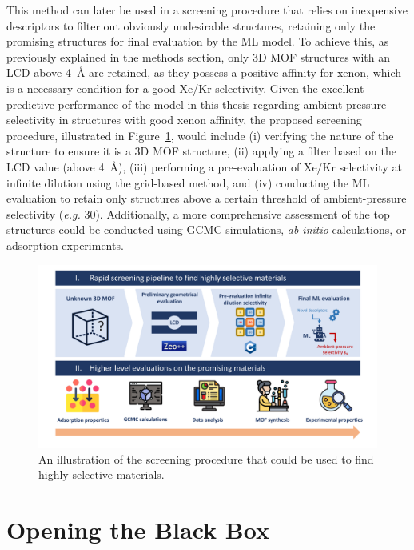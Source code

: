 \documentclass[main]{subfiles}
\begin{document}
This method can later be used in a screening procedure that relies on inexpensive descriptors to filter out obviously undesirable structures, retaining only the promising structures for final evaluation by the ML model. To achieve this, as previously explained in the methods section, only 3D MOF structures with an LCD above \SI{4}{\angstrom} are retained, as they possess a positive affinity for xenon, which is a necessary condition for a good Xe/Kr selectivity. Given the excellent predictive performance of the model in this thesis regarding ambient pressure selectivity in structures with good xenon affinity, the proposed screening procedure, illustrated in Figure~\ref{fgr:pipeline}, would include (i) verifying the nature of the structure to ensure it is a 3D MOF structure, (ii) applying a filter based on the LCD value (above \SI{4}{\angstrom}), (iii) performing a pre-evaluation of Xe/Kr selectivity at infinite dilution using the grid-based method, and (iv) conducting the ML evaluation to retain only structures above a certain threshold of ambient-pressure selectivity (\emph{e.g.} 30). Additionally, a more comprehensive assessment of the top structures could be conducted using GCMC simulations, \emph{ab initio} calculations, or adsorption experiments.

\begin{figure}[ht]
\centering
  \includegraphics[width=0.99\linewidth]{figures/4-ml/main/pipeline.pdf}
  \caption{An illustration of the screening procedure that could be used to find highly selective materials.}\label{fgr:pipeline}
\end{figure}

\section{Opening the Black Box}
\end{document}
